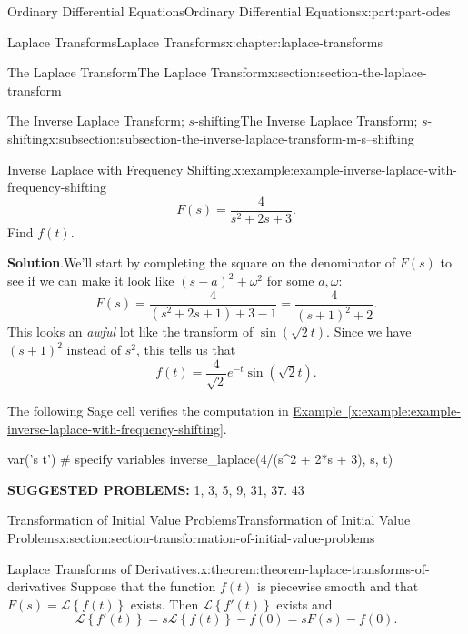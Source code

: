 \documentclass[twoside,10pt,]{book}
\newcommand{\blocktitlefont}{\relax}
\newcommand{\xreffont}{\relax}
\newcommand{\terminology}[1]{\textbf{#1}}
\numberwithin{equation}{part}
\newcommand{\Laplace}[1]{\mathcal{L}\left\{#1\right\}}
\begin{document}
\begin{partptx}{Ordinary Differential Equations}{}{Ordinary Differential Equations}{}{}{x:part:part-odes}
\begin{chapterptx}{Laplace Transforms}{}{Laplace Transforms}{}{}{x:chapter:laplace-transforms}
\begin{sectionptx}{The Laplace Transform}{}{The Laplace Transform}{}{}{x:section:section-the-laplace-transform}
\begin{subsectionptx}{The Inverse Laplace Transform; \(s\)-shifting}{}{The Inverse Laplace Transform; \(s\)-shifting}{}{}{x:subsection:subsection-the-inverse-laplace-transform-m-s--shifting}
\begin{example}{Inverse Laplace with Frequency Shifting.}{x:example:example-inverse-laplace-with-frequency-shifting}
\begin{equation*}
F(s) = \frac{4}{s^{2}+2s+3}.
\end{equation*}
Find \(f(t)\).%
\par\smallskip%
\noindent\textbf{\blocktitlefont Solution}.\hypertarget{g:solution:idp105548816625696}{}\quad{}We'll start by completing the square on the denominator of \(F(s)\) to see if we can make it look like \((s-a)^{2}+\omega^{2}\) for some \(a,\omega\):%
\begin{equation*}
F(s) = \frac{4}{(s^{2}+2s+1)+3-1} = \frac{4}{(s+1)^{2}+2}.
\end{equation*}
This looks an \emph{awful} lot like the transform of \(\sin(\sqrt{2}t)\). Since we have \((s+1)^{2}\) instead of \(s^{2}\), this tells us that%
\begin{equation*}
f(t) = \frac{4}{\sqrt{2}}e^{-t}\sin(\sqrt{2}t).
\end{equation*}
%
\end{example}
The following Sage cell verifies the computation in \hyperref[x:example:example-inverse-laplace-with-frequency-shifting]{Example~{\xreffont\ref{x:example:example-inverse-laplace-with-frequency-shifting}}}.%
\begin{sageinput}
var('s t') # specify variables
inverse_laplace(4/(s^2 + 2*s + 3), s, t)
\end{sageinput}
\terminology{SUGGESTED PROBLEMS:} 1, 3, 5, 9, 31, 37. 43\end{subsectionptx}
\end{sectionptx}
%
%
\typeout{************************************************}
\typeout{************************************************}
%
\begin{sectionptx}{Transformation of Initial Value Problems}{}{Transformation of Initial Value Problems}{}{}{x:section:section-transformation-of-initial-value-problems}
\begin{theorem}{Laplace Transforms of Derivatives.}{}{x:theorem:theorem-laplace-transforms-of-derivatives}%
Suppose that the function \(f(t)\) is piecewise smooth and that \(F(s) = \Laplace{f(t)}\) exists. Then \(\Laplace{f'(t)}\) exists and%
\begin{equation*}
\Laplace{f'(t)} = s\Laplace{f(t)}-f(0) = sF(s)-f(0).
\end{equation*}
%
\end{theorem}

\end{sectionptx}
\end{chapterptx}
\end{partptx}
\end{document}
